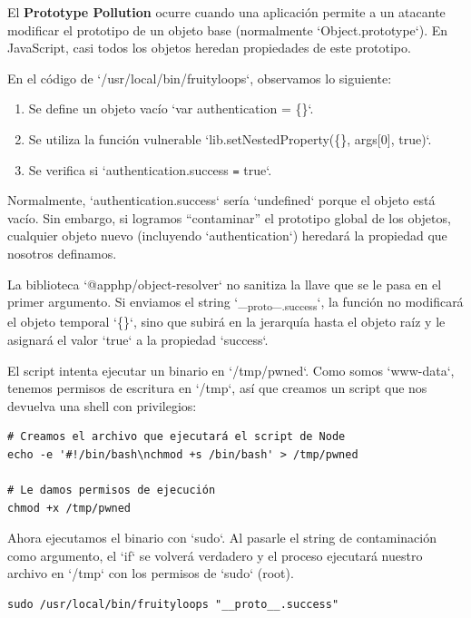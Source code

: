 \documentclass[11pt, letterpaper]{article}
\begin{document}
El \textbf{\textbf{Prototype Pollution}} ocurre cuando una aplicación permite a un atacante modificar el prototipo de un objeto base (normalmente `Object.prototype`). En JavaScript, casi todos los objetos heredan propiedades de este prototipo.

En el código de `/usr/local/bin/fruityloops`, observamos lo siguiente:

\begin{enumerate}
\item Se define un objeto vacío `var authentication = \{\}`.

\item Se utiliza la función vulnerable `lib.setNestedProperty(\{\}, args[0], true)`.

\item Se verifica si `authentication.success \texttt{=} true`.
\end{enumerate}

Normalmente, `authentication.success` sería `undefined` porque el objeto está vacío. Sin embargo, si logramos ``contaminar'' el prototipo global de los objetos, cualquier objeto nuevo (incluyendo `authentication`) heredará la propiedad que nosotros definamos.

La biblioteca `@apphp/object-resolver` no sanitiza la llave que se le pasa en el primer argumento. Si enviamos el string `\_\textsubscript{proto}\_\textsubscript{.success}`, la función no modificará el objeto temporal `\{\}`, sino que subirá en la jerarquía hasta el objeto raíz y le asignará el valor `true` a la propiedad `success`.

El script intenta ejecutar un binario en `/tmp/pwned`. Como somos `www-data`, tenemos permisos de escritura en `/tmp`, así que creamos un script que nos devuelva una shell con privilegios:

\begin{verbatim}
# Creamos el archivo que ejecutará el script de Node
echo -e '#!/bin/bash\nchmod +s /bin/bash' > /tmp/pwned

# Le damos permisos de ejecución
chmod +x /tmp/pwned

\end{verbatim}

Ahora ejecutamos el binario con `sudo`. Al pasarle el string de contaminación como argumento, el `if` se volverá verdadero y el proceso ejecutará nuestro archivo en `/tmp` con los permisos de `sudo` (root).

\begin{verbatim}
sudo /usr/local/bin/fruityloops "__proto__.success"
\end{verbatim}
\end{document}
